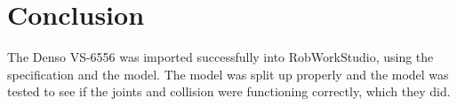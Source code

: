 \section{Conclusion}
\label{sec:conclusion}

The Denso VS-6556 was imported successfully into RobWorkStudio, using the specification and the model. The model was split up properly and the model was tested to see if the joints and collision were functioning correctly, which they did. 